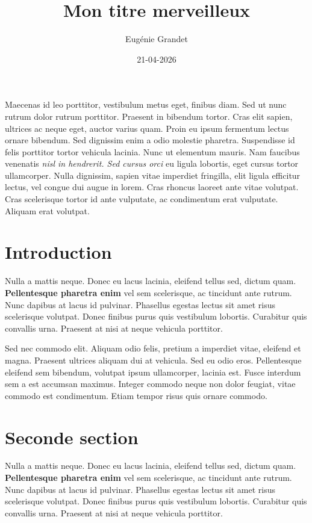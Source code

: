 \documentclass[]{article}
\title{Mon titre merveilleux}
\author{Eugénie Grandet}
\date{21-04-2026}
\begin{document}
\maketitle

\HandRight
Maecenas id leo porttitor, vestibulum metus eget, finibus diam. Sed ut nunc rutrum dolor rutrum porttitor. Praesent in bibendum tortor. Cras elit sapien, ultrices ac neque eget, auctor varius quam. Proin eu ipsum fermentum lectus ornare bibendum. Sed dignissim enim a odio molestie pharetra. Suspendisse id felis porttitor tortor vehicula lacinia. Nunc ut elementum mauris. Nam faucibus venenatis \emph{nisl in hendrerit. Sed cursus orci} eu ligula lobortis, eget cursus tortor ullamcorper. Nulla dignissim, sapien vitae imperdiet fringilla, elit ligula efficitur lectus, vel congue dui augue in lorem. Cras rhoncus laoreet ante vitae volutpat. Cras scelerisque tortor id ante vulputate, ac condimentum erat vulputate. Aliquam erat volutpat.


\section*{Introduction}

Nulla a mattis neque. Donec eu lacus lacinia, eleifend tellus sed, dictum quam. \textbf{Pellentesque pharetra enim} vel sem scelerisque, ac tincidunt ante rutrum. Nunc dapibus at lacus id pulvinar. Phasellus egestas lectus sit amet risus scelerisque volutpat. Donec finibus purus quis vestibulum lobortis. Curabitur quis convallis urna. Praesent at nisi at neque vehicula porttitor.

Sed nec commodo elit. Aliquam odio felis, pretium a imperdiet vitae, eleifend et magna. Praesent ultrices aliquam dui at vehicula. Sed eu odio eros. Pellentesque eleifend sem bibendum, volutpat ipsum ullamcorper, lacinia est. Fusce interdum sem a est accumsan maximus. Integer commodo neque non dolor feugiat, vitae commodo est condimentum. Etiam tempor risus quis ornare commodo.

\section{Seconde section}

Nulla a mattis neque. Donec eu lacus lacinia, eleifend tellus sed, dictum quam. \textbf{Pellentesque pharetra enim} vel sem scelerisque, ac tincidunt ante rutrum. Nunc dapibus at lacus id pulvinar. Phasellus egestas lectus sit amet risus scelerisque volutpat. Donec finibus purus quis vestibulum lobortis. Curabitur quis convallis urna. Praesent at nisi at neque vehicula porttitor.
\end{document}
